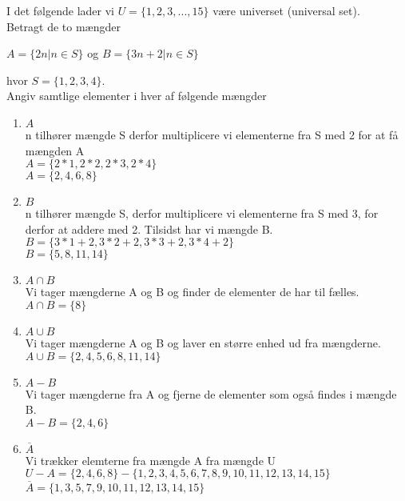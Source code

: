 
I det følgende lader vi $U=\{1,2,3,...,15\}$ være universet (universal set).
\\Betragt de to mængder
\\ \begin{center} $A=\{2n|n \in S\}$ og $B=\{3n+2|n\in S\}$ \end{center}
hvor $S=\{1,2,3,4\}$.
\\Angiv samtlige elementer i hver af følgende mængder

\begin{enumerate}[label=(\alph*)] 
\item $A$
\\n tilhører mængde S derfor multiplicere vi elementerne
 fra S med 2 for at få mængden A
\\ $A=\{2*1,2*2,2*3,2*4\}$
\\ $A=\{2,4,6,8\}$

\item $B$
\\ n tilhører mængde S, derfor multiplicere vi elementerne fra S med 3, for derfor at addere med 2. Tilsidst har vi mængde B.
\\$B=\{3*1+2,3*2+2,3*3+2,3*4+2\}$
\\$B=\{5,8,11,14\}$

\item $A \cap B$
\\ Vi tager mængderne A og B og finder de elementer de har til fælles.
\\$A \cap B=\{8\}$

\item $A \cup B$
\\ Vi tager mængderne A og B og laver en større enhed ud fra mængderne.
\\$A \cup B=\{2,4,5,6,8,11,14\}$

\item $A-B$
\\Vi tager mængderne fra A og fjerne de elementer som også findes i mængde B.
\\$A-B=\{2,4,6\}$

\item $\overline{A}$
\\Vi trækker elemterne fra mængde A fra mængde U
\\ $U-A=\{2,4,6,8\}-\{1,2,3,4,5,6,7,8,9,10,11,12,13,14,15\}$
\\ $\overline{A}=\{1,3,5,7,9,10,11,12,13,14,15\}$

\end{enumerate}


